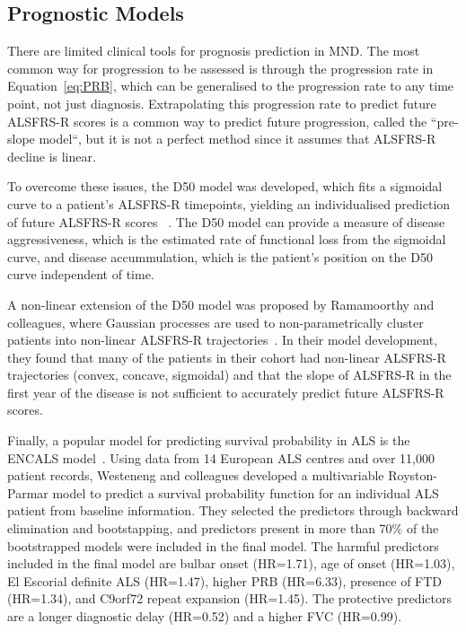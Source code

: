 \subsection{Prognostic Models}
There are limited clinical tools for prognosis prediction in MND. The most common way for progression to be assessed is through the progression rate in Equation~\ref{eq:PRB}, which can be generalised to the progression rate to any time point, not just diagnosis.
Extrapolating this progression rate to predict future ALSFRS-R scores is a common way to predict future progression, called the ``pre-slope model``, but it is not a perfect method since it assumes that ALSFRS-R decline is linear.

To overcome these issues, the D50 model was developed, which fits a sigmoidal curve to a patient's ALSFRS-R timepoints, yielding an individualised prediction of future ALSFRS-R scores
~\cite{poesenNeurofilamentMarkersALS2017, steinbachApplyingD50Disease2020}.
The D50 model can provide a measure of disease aggressiveness, which is the estimated rate of functional loss from the sigmoidal curve, and disease accummulation, which is the patient's position on the D50 curve independent of time.

A non-linear extension of the D50 model was proposed by Ramamoorthy and colleagues, where Gaussian processes are used to non-parametrically cluster patients into non-linear ALSFRS-R trajectories~\cite{ramamoorthyIdentifyingPatternsAmyotrophic2022}.
In their model development, they found that many of the patients in their cohort had non-linear ALSFRS-R trajectories (convex, concave, sigmoidal) and that the slope of ALSFRS-R in the first year of the disease is not sufficient to accurately predict future ALSFRS-R scores.

Finally, a popular model for predicting survival probability in ALS is the ENCALS model~\cite{westenengPrognosisPatientsAmyotrophic2018}.
Using data from 14 European ALS centres and over 11,000 patient records, Westeneng and colleagues developed a multivariable Royston-Parmar model to predict a survival probability function for an individual ALS patient from baseline information.
They selected the predictors through backward elimination and bootstapping, and predictors present in more than 70\% of the bootstrapped models were included in the final model.
The harmful predictors included in the final model are bulbar onset (HR=1.71), age of onset (HR=1.03), El Escorial definite ALS (HR=1.47), higher PRB (HR=6.33), presence of FTD (HR=1.34), and C9orf72 repeat expansion (HR=1.45).
The protective predictors are a longer diagnostic delay (HR=0.52) and a higher FVC (HR=0.99).

